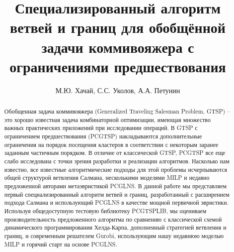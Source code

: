 \documentclass{article}
\author{М.Ю. Хачай, С.С. Уколов, А.А. Петунин}
\title{
Специализированный алгоритм ветвей и границ
для обобщённой задачи коммивояжера
с ограничениями предшествования
}
\begin{document}
\maketitle

\begin{abstract}
Обобщенная задача коммивояжера (Generalized Traveling Salesman Problem, GTSP) --
это хорошо известная задача комбинаторной оптимизации,
имеющая множество важных практических приложений при исследовании операций.
В GTSP с ограничением предшествования (PCGTSP)
накладываются дополнительные ограничения на порядок
посещения кластеров в соответствии
с некоторым заранее заданным частичным порядком.
В отличие от классической GTSP,
PCGTSP все еще слабо исследована с точки зрения разработки и реализации алгоритмов.
Насколько нам известно,
все известные алгоритмические подходы для этой проблемы
исчерпываются общей структурой ветвления Салмана,
несколькими моделями MILP
и недавно предложенной авторами метаэвристикой PCGLNS.
В данной работе мы представляем первый специализированный алгоритм ветвей и границ,
разработанный с расширением подхода Салмана и использующий PCGLNS
в качестве мощной первичной эвристики.
Используя общедоступную тестовую библиотеку PCGTSPLIB,
мы оцениваем производительность предложенного алгоритма
по сравнению с классической схемой динамического программирования Хелда-Карпа,
дополненный стратегией ветвления и границ,
и современным решателем Gurobi,
использующим нашу недавнюю моделью MILP
и горячий старт на основе PCGLNS.

\end{abstract}


% 







% 
% 
% 



\end{document}
